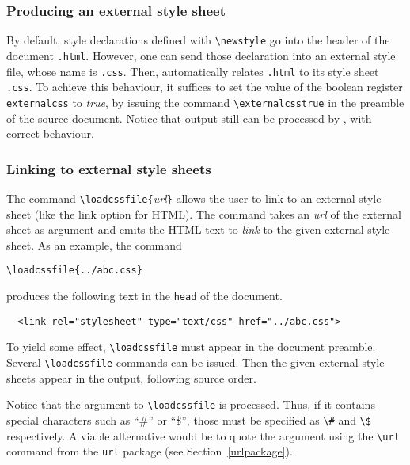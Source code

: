 \subsubsection{Producing an external style sheet}
%
%
By default,  style declarations defined with
\verb+\newstyle+ go into the header of the \html{} document
\texttt{.html}.
However, one can send those declaration into an external style file,
whose name is \texttt{.css}.
Then, \hevea{} automatically relates \texttt{.html} to
its style sheet  \texttt{.css}.
To achieve this behaviour, it suffices to set the value of the boolean
register \texttt{externalcss} to \textit{true}, by issuing the command
\verb+\externalcsstrue+ in the preamble of the source document.
Notice that \hevea{} output still can be processed by \hacha{}, with
correct behaviour.


\subsubsection{Linking to external style sheets}
%
%
The \hevea{} command \verb+\loadcssfile{+\textit{url}\verb+}+ allows the
user to link to an external style sheet (like the link option for
HTML). The command takes an \textit{url} of the external
sheet as argument and emits the HTML text to
\emph{link} to the given external style sheet. As an example, the command
\begin{verbatim}
\loadcssfile{../abc.css}
\end{verbatim}
produces the following \html{} text in the \verb+head+ of the document.
\begin{verbatim}
  <link rel="stylesheet" type="text/css" href="../abc.css">
\end{verbatim} 
To yield some effect, \verb+\loadcssfile+ must appear in the document
preamble.  Several \verb+\loadcssfile+ commands can be issued.  Then
the given external style sheets appear in the output, following source
order.

Notice that the argument to \verb+\loadcssfile+ is processed. Thus, if it
contains special characters such as ``\#'' or ``\$'', those must be specified
as \verb+\#+ and \verb+\$+ respectively.
A viable alternative would be to quote
the argument using the \verb+\url+ command from the \texttt{url}
package (see Section~\ref{urlpackage}).

